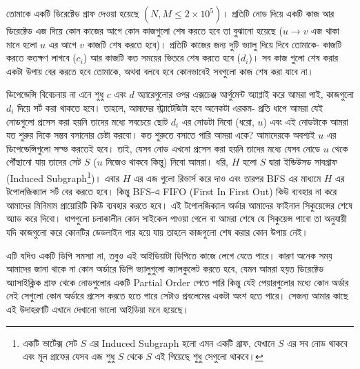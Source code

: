 \begin{example}
তোমাকে একটি ডিরেক্টেড গ্রাফ দেওয়া হয়েছে $(N, M \le 2\times 10^5)$। প্রতিটি নোড দিয়ে একটি কাজ আর ডিরেক্টেড এজ দিয়ে কোন কাজের আগে কোন কাজগুলো শেষ করতে হবে তা বুঝানো হয়েছে ($u \rightarrow v$ এজ থাকা মানে হলো $u$ এর আগে $v$ কাজটি শেষ করতে হবে)। প্রতিটি কাজের জন্য দুটি ভ্যালু দিয়ে দিবে তোমাকে- কাজটি করতে কতক্ষণ লাগবে ($c_i$) আর কাজটি কত সময়ের ভিতরে শেষ করতে হবে ($d_i$)। সব কাজ গুলো শেষ করার একটা উপায় বের করতে হবে তোমাকে, অথবা বলবে হবে কোনভাবেই সবগুলো কাজ শেষ করা যাবে না।
\end{example}
\begin{solution}
ডিপেন্ডেন্সি বিবেচনায় না এনে শুধু $c$ এবং $d$ অ্যারেগুলোর ওপর এক্সচেঞ্জ আর্গুমেন্ট অ্যাপ্লাই করে আমরা পাই, কাজগুলো $d_i$ দিয়ে সর্ট করা থাকতে হবে। তাহলে, আমাদের স্ট্র্যাটেজিটা হবে অনেকটা এরকম- 	প্রতি ধাপে আমরা যেই নোডগুলো প্রসেস করা হয়নি তাদের মধ্যে সবচেয়ে ছোট $d_i$ এর নোডটা নিবো (ধরো, $u$) এবং এই নোডটাকে আমরা যত শুরুর দিকে সম্ভব বসানোর চেষ্টা করবো। কত শুরুতে বসাতে পারি আমরা একে? আমাদেরকে অবশ্যই $u$ এর ডিপেন্ডেন্সিগুলো সল্ভ করতেই হবে। তাই, যেসব নোড এখনো প্রসেস করা হয়নি তাদের মধ্যে যেসব নোডে $u$ থেকে পৌঁছানো যায় তাদের সেট $S$ ($u$ নিজেও থাকবে কিন্তু) নিবো আমরা। 	ধরি, $H$ হলো $S$ দ্বারা ইন্ডিউসড সাবগ্রাফ (Induced Subgraph\footnote{একটি ভার্টেক্স সেট $S$ এর Induced Subgraph হলো এমন একটি গ্রাফ, যেখানে $S$ এর সব নোড থাকবে এবং মূল গ্রাফের যেসব এজ শুধু $S$ থেকে $S$ এই গিয়েছে শুধু সেগুলো থাকবে।})। এবার $H$ এর এজ গুলো রিভার্স করে দাও এবং তারপর BFS এর মাধ্যমে $H$ এর টপোলজিক্যাল সর্ট বের করতে হবে। কিন্তু BFS-এ FIFO (First In First Out) কিউ ব্যবহার না করে আমাদের মিনিমাম প্রায়োরিটি কিউ ব্যবহার করতে হবে। এই টপোলজিক্যাল অর্ডার আমাদের ফাইনাল সিকুয়েন্সের শেষে অ্যাড করে দিবো। ধাপগুলো চলাকালীন কোন সাইকেল পাওয়া গেলে বা আমরা শেষে যে সিকুয়েন্স পাবো তা অনুযায়ী যদি কাজগুলো করে কোনটির ডেডলাইন পার হয়ে যায় তাহলে কাজগুলো শেষ করার কোন উপায় নেই।
\end{solution}

এটি যদিও একটি ডিপি সমস্যা না, তবুও এই আইডিয়াটা ডিপিতে কাজে লেগে যেতে পারে। কারণ অনেক সময় আমাদের জানা থাকে না কোন অর্ডারে ডিপি ভ্যালুগুলো ক্যালকুলেট করতে হবে, যেমন আমরা হয়ত ডিরেক্টেড অ্যাসাইক্লিক গ্রাফ থেকে নোডগুলোর একটি Partial Order পেতে পারি কিন্তু যেই পেয়ারগুলোর মধ্যে কোন অর্ডার নেই সেগুলো কোন অর্ডারে প্রসেস করতে হতে পারে সেটাও প্রবলেমের একটা অংশ হতে পারে। সেজন্য আমার কাছে এই উদাহরণটি এখানে দেখানো ভালো আইডিয়া মনে হয়েছে।

